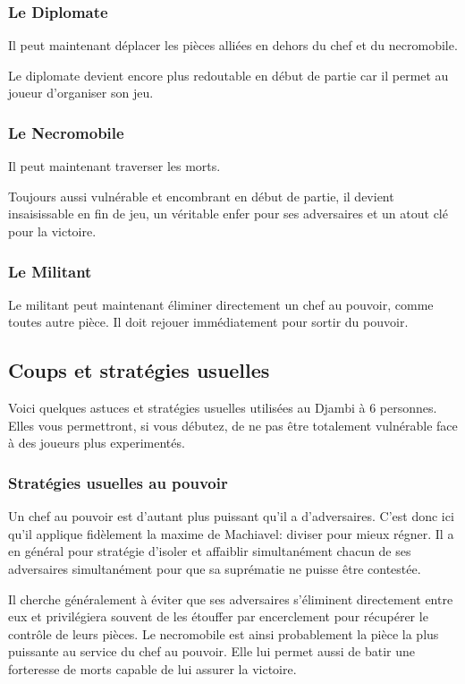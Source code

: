 \documentclass{article}
\begin{document}
\subsubsection{Le Diplomate}
Il peut maintenant déplacer les pièces alliées en dehors du chef et du necromobile.

Le diplomate devient encore plus redoutable en début de partie car il permet au joueur d'organiser son jeu.

\subsubsection{Le Necromobile}
Il peut maintenant traverser les morts.

Toujours aussi vulnérable et encombrant en début de partie, il devient insaisissable en fin de jeu, un véritable enfer pour ses adversaires et un atout clé pour la victoire.

\subsubsection{Le Militant}
Le militant peut maintenant éliminer directement un chef au pouvoir, comme toutes autre pièce. 
Il doit rejouer immédiatement pour sortir du pouvoir.


\newpage

\subsection{Coups et stratégies usuelles}

Voici quelques astuces et stratégies usuelles utilisées au Djambi à 6 personnes. 
Elles vous permettront, si vous débutez, de ne pas être totalement vulnérable face à des joueurs plus experimentés.

\subsubsection{Stratégies usuelles au pouvoir}

Un chef au pouvoir est d'autant plus puissant qu'il a d'adversaires.
C'est donc ici qu'il applique fidèlement la maxime de Machiavel: diviser pour mieux régner.
Il a en général pour stratégie d'isoler et affaiblir simultanément chacun de ses adversaires simultanément pour que sa suprématie ne puisse être contestée.

Il cherche généralement à éviter que ses adversaires s'éliminent directement entre eux et privilégiera souvent de les étouffer par encerclement pour récupérer 
le contrôle de leurs pièces.
Le necromobile est ainsi probablement la pièce la plus puissante au service du chef au pouvoir. Elle lui permet aussi de batir une forteresse de morts 
capable de lui assurer la victoire.
\end{document}
